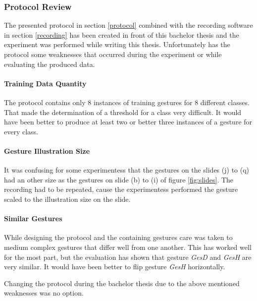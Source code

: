 \subsubsection{Protocol Review} \label{protocol_review}
The presented protocol in section \ref{protocol} combined with the recording software in section \ref{recording} has
been created in front of this bachelor thesis and the experiment was performed while writing this thesis. Unfortunately
has the protocol some weaknesses that occurred during the experiment or while evaluating the produced data.

\paragraph{Training Data Quantity} The protocol contains only 8 instances of training gestures for 8 different classes.
That made the determination of a threshold for a class very difficult. It would have been better to produce at least two
or better three instances of a gesture for every class.

\paragraph{Gesture Illustration Size} It was confusing for some experimentess that the gestures on the slides (j) to (q)
had an other size as the gestures on slide (b) to (i) of figure \ref{fig:slides}. The recording had to be repeated,
cause the experimentess performed the gesture scaled to the illustration size on the slide.

\paragraph{Similar Gestures} While designing the protocol and the containing gestures care was taken to medium complex
gestures that differ well from one another. This has worked well for the most part, but the evaluation has shown that
gesture \textit{GesD} and \textit{GesH} are very similar. It would have been better to flip gesture \textit{GesH}
horizontally.

Changing the protocol during the bachelor thesis due to the above mentioned weaknesses was no option.
